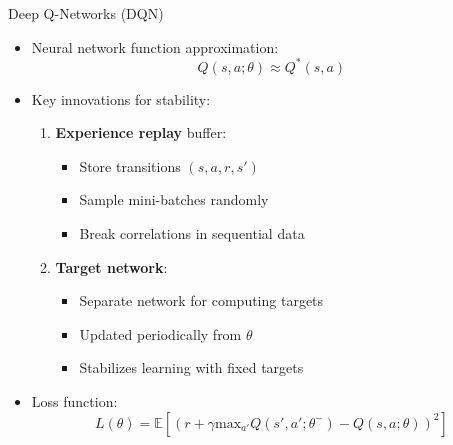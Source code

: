 \documentclass[10pt]{beamer}
\newcommand{\E}{\mathbb{E}}
\renewcommand{\max}{\text{max}}
\begin{document}
\begin{frame}{Deep Q-Networks (DQN)}
    \begin{itemize}
        \item Neural network function approximation:
        \begin{equation}
            Q(s,a;\theta) \approx Q^*(s,a)
        \end{equation}
        
        \item Key innovations for stability:
        \begin{enumerate}
            \item \textbf{Experience replay} buffer:
            \begin{itemize}
                \item Store transitions $(s, a, r, s')$
                \item Sample mini-batches randomly
                \item Break correlations in sequential data
            \end{itemize}
            
            \item \textbf{Target network}:
            \begin{itemize}
                \item Separate network for computing targets
                \item Updated periodically from $\theta$
                \item Stabilizes learning with fixed targets
            \end{itemize}
        \end{enumerate}
        
        \item Loss function:
        \begin{equation}
            L(\theta) = \E \left[ \left( r + \gamma \max_{a'} Q(s',a';\theta^-) - Q(s,a;\theta) \right)^2 \right]
        \end{equation}
    \end{itemize}
\end{frame}
\end{document}
